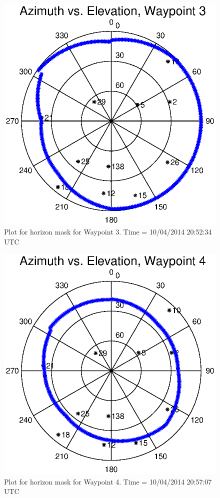 \documentclass[]{aiaa-tc}%
\begin{document}
	\begin{figure}[H]
		\centering
		\includegraphics[width = 13cm]{AzElWaypoint3.eps}
		\caption{Plot for horizon mask for Waypoint 3. Time = 10/04/2014 20:52:34 UTC}
		\label{fig:AzElWaypoint3}
	\end{figure}
	
	\begin{figure}[H]
		\centering
		\includegraphics[width = 13cm]{AzElWaypoint4.eps}
		\caption{Plot for horizon mask for Waypoint 4. Time = 10/04/2014 20:57:07 UTC}
		\label{fig:AzElWaypoint4}
	\end{figure}
	
\end{document}
